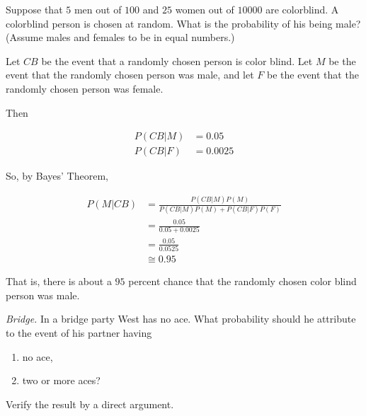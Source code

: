 \begin{problem}[Handout 4, \# 9]
  Suppose that \(5\) men out of \(100\) and \(25\) women out of
  \(\num{10000}\) are colorblind. A colorblind person is chosen at
  random. What is the probability of his being male? (Assume males and
  females to be in equal numbers.)
\end{problem}
\begin{solution}

Let $CB$ be the event that a randomly chosen person is color blind. Let $M$ be the event that the randomly chosen person was male, and let $F$ be the event that the randomly chosen person was female.

Then

\begin{align*}
P(CB | M) &= 0.05 \\
P(CB | F) &= 0.0025
\end{align*}

So, by Bayes' Theorem,

\begin{align*}
P(M | CB) &= \frac{P(CB|M)P(M)}{P(CB|M)P(M) + P(CB|F)P(F)}\\
&= \frac{0.05}{0.05+0.0025}\\
&= \frac{0.05}{0.0525}\\
&\cong 0.95
\end{align*}

That is, there is about a $95$ percent chance that the randomly chosen color blind person was male.

\end{solution}
\newpage

\begin{problem}[Handout 4, \# 10]
  \emph{Bridge.} In a bridge party West has no ace. What probability should
  he attribute to the event of his partner having
  \begin{enumerate}[label=(\alph*),noitemsep]
  \item no ace,
  \item two or more aces?
  \end{enumerate}
  Verify the result by a direct argument.
\end{problem}
\begin{solution}

\end{solution}
\newpage

